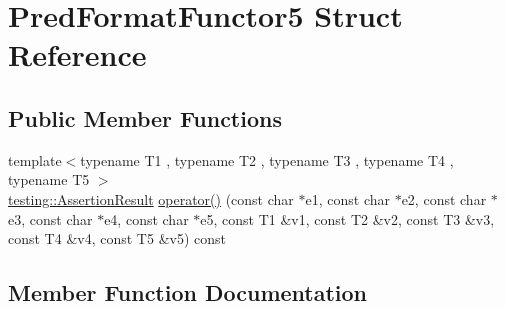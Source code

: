 \hypertarget{structPredFormatFunctor5}{}\section{Pred\+Format\+Functor5 Struct Reference}
\label{structPredFormatFunctor5}
\subsection*{Public Member Functions}
\begin{DoxyCompactItemize}
\item 
{\footnotesize template$<$typename T1 , typename T2 , typename T3 , typename T4 , typename T5 $>$ }\\\hyperlink{classtesting_1_1AssertionResult}{testing\+::\+Assertion\+Result} \hyperlink{structPredFormatFunctor5_afbadd6fc310c388477ce0c13aea58b30}{operator()} (const char $\ast$e1, const char $\ast$e2, const char $\ast$e3, const char $\ast$e4, const char $\ast$e5, const T1 \&v1, const T2 \&v2, const T3 \&v3, const T4 \&v4, const T5 \&v5) const 
\end{DoxyCompactItemize}


\subsection{Member Function Documentation}

